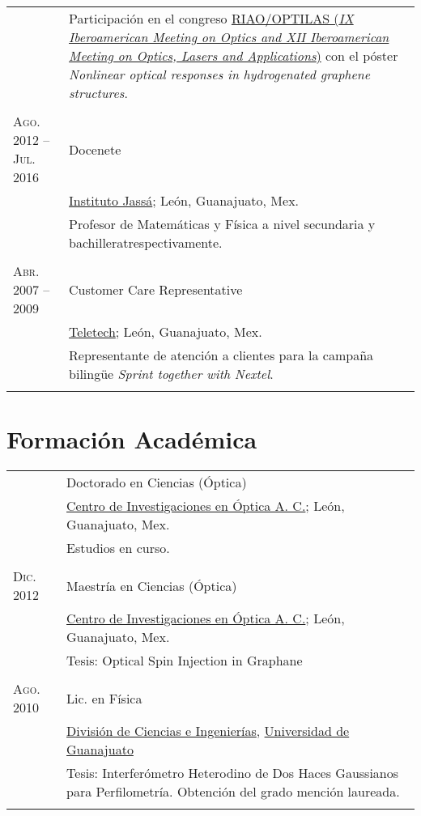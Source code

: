 \documentclass[letterpaper,10pt]{article}
\begin{document}
\begin{tabular}{R{4cm}|p{11cm}}
						&	\footnotesize{Participaci\'on en el congreso \href{http://riaooptilas.cefop.cl/en/}{RIAO/OPTILAS (\emph{IX Iberoamerican Meeting on Optics and XII Iberoamerican Meeting on Optics, Lasers and Applications})} con el p\'oster \emph{Nonlinear optical responses in hydrogenated graphene structures}.}\\
						 \\
\textsc{Ago. 2012 -- Jul. 2016 }	&	Docenete \\
						&	\href{http://www.institutojassa.edu.mx/}{Instituto Jass\'a}; Le\'on, Guanajuato, Mex.\\
						&	\footnotesize{Profesor de Matem\'aticas y F\'isica a nivel secundaria y bachilleratrespectivamente.}\\
						 \\
\textsc{Abr. 2007 -- 2009}	&	Customer Care Representative\\
							&	\href{http://www.teletech.com/worldwide/spanish}{Teletech}; Le\'on, Guanajuato, Mex.\\
							&	\footnotesize{Representante de atenci\'on a clientes para la campa\~na biling\"ue \emph{Sprint together with Nextel}.}\\
							 \\
\end{tabular}

\newpage
\section{Formaci\'on Acad\'emica}
\begin{tabular}{R{4cm}|p{11cm}}
					&	Doctorado en Ciencias (\'Optica) \\
					&	\href{http://www.cio.mx/}{Centro de Investigaciones en \'Optica A. C.}; Le\'on, Guanajuato, Mex.\\
					&	Estudios en curso.\\
					 \\

\textsc{Dic. 2012 }	&	Maestr\'ia en Ciencias (\'Optica) \\
					&	\href{http://www.cio.mx/}{Centro de Investigaciones en \'Optica A. C.}; Le\'on, Guanajuato, Mex.\\
					&	Tesis: Optical Spin Injection in Graphane\\
					 \\

\textsc{Ago. 2010 }	&	Lic. en F\'isica \\
					&	\href{https://fisica.ugto.mx}{Divisi\'on de Ciencias e Ingenier\'ias}, \href{http://www.ugto.mx}{Universidad de Guanajuato}\\
					&	Tesis: Interfer\'ometro Heterodino de Dos Haces Gaussianos para Perfilometr\'ia. Obtenci\'on del grado menci\'on laureada.\\
					 \\
\end{tabular}
\end{document}
